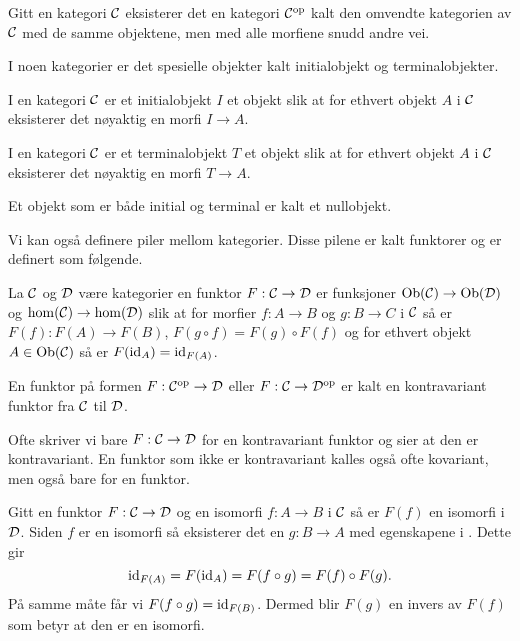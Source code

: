 \begin{bemerk}\label{rem:OpKat}
  Gitt en kategori $\mathcal{C}$ eksisterer det en kategori $\mathcal{C}^{\textnormal{op}}$
  kalt den omvendte kategorien av $\mathcal{C}$ med de samme objektene,
  men med alle morfiene snudd andre vei.
\end{bemerk}

I noen kategorier er det spesielle objekter kalt initialobjekt og
terminalobjekter.

\begin{definisjon}\label{def:InitOb}
  I en kategori $\mathcal{C}$ er et initialobjekt $I$ et objekt
  slik at for ethvert objekt $A$ i $\mathcal{C}$ eksisterer det nøyaktig en
  morfi $I\to A$.
\end{definisjon}

\begin{definisjon}\label{def:TermOb}
  I en kategori $\mathcal{C}$ er et terminalobjekt $T$ et
  objekt slik at for ethvert objekt $A$ i $\mathcal{C}$ eksisterer det nøyaktig en morfi $T\to A$.
\end{definisjon}

Et objekt som er både initial og terminal er kalt et nullobjekt.

Vi kan også definere piler mellom kategorier. Disse pilene er kalt funktorer og er definert som følgende.
\begin{definisjon}\label{Def:Funktor}
    La $\mathcal{C}$ og $\mathcal{D}$ være kategorier en funktor $F:\mathcal{C}\to\mathcal{D}$ er funksjoner $\textnormal{Ob}(\mathcal{C})\to\textnormal{Ob}(\mathcal{D})$ og
    $\hom(\mathcal{C})\to \hom(\mathcal{D})$ slik at for morfier $f: A\to B$ og $g: B\to C$ i $\mathcal{C}$ så er $F(f): F(A)\to
    F(B)$, $F(g\circ f) = F(g)\circ F(f)$ og for ethvert objekt $A\in\textnormal{Ob}(\mathcal{C})$ så er $F(\textnormal{id}_A)=\textnormal{id}_{F(A)}$.
\end{definisjon}

\begin{definisjon}\label{def:KontraFunktor}
  En funktor på formen $F:\mathcal{C}^{\textnormal{op}}\to\mathcal{D}$ eller
  $F:\mathcal{C}\to\mathcal{D}^{\textnormal{op}}$ er kalt en kontravariant funktor fra
  $\mathcal{C}$ til $\mathcal{D}$.
\end{definisjon}

Ofte skriver vi bare $F:\mathcal{C}\to\mathcal{D}$ for en kontravariant
funktor og sier at den er kontravariant. En funktor som ikke er
kontravariant kalles også ofte kovariant, men også bare for en
funktor.

\begin{bemerk}\label{Rem:FunktorIso}
    Gitt en funktor $F:\mathcal{C}\to\mathcal{D}$ og en isomorfi $f:A\to B$ i $\mathcal{C}$ så er $F(f)$ en isomorfi i $\mathcal{D}$. Siden $f$ er en isomorfi så eksisterer det en $g: B\to A$ med egenskapene i . Dette gir 
    \[\textnormal{id}_{F(A)} = F(\textnormal{id}_A) = F(f\circ g) = F(f)\circ F(g).\]
    På samme måte får vi $F(f\circ g) = \textnormal{id}_{F(B)}$. Dermed blir $F(g)$ en invers av $F(f)$ som betyr at den er en isomorfi.
\end{bemerk}

